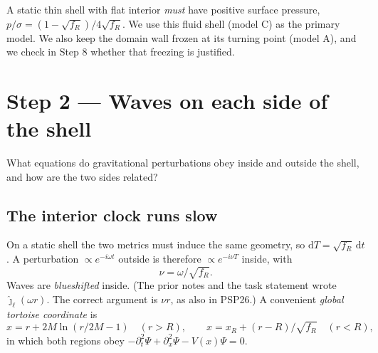 \documentclass[11pt,a4paper]{article}
\numberwithin{equation}{section}
\newcommand{\sq}{\sqrt{f_R}}
\newcommand{\dd}{\mathrm{d}}
\newcommand{\jh}{\hat\jmath_\ell}
\begin{document}
\begin{table}[h]\centering\small
\caption{Background quantities of models C and A. $\omega_{\rm dyn}=\sq(|\ddot R|/R)^{1/2}$ is the wall's collapse rate in
exterior time; $(M/R^3)^{1/2}$ sets the scale of the fluid shell's matter modes.}\label{tab:bg}
\resizebox{\textwidth}{!}{}
\end{table}

\begin{learned}
A static thin shell with flat interior \emph{must} have positive surface pressure, $p/\sigma=(1-\sq)/4\sq$. We use this
fluid shell (model C) as the primary model. We also keep the domain wall frozen at its turning point (model A), and we
check in Step 8 whether that freezing is justified.
\end{learned}

\section{Step 2 --- Waves on each side of the shell}\label{sec:pert}
\begin{question}
What equations do gravitational perturbations obey inside and outside the shell, and how are the two sides related?
\end{question}

\subsection{The interior clock runs slow}
On a static shell the two metrics must induce the same geometry, so $\dd T=\sq\,\dd t$. A perturbation
$\propto e^{-i\omega t}$ outside is therefore $\propto e^{-i\nu T}$ inside, with
\begin{equation}
\nu=\omega/\sq .
\label{eq:nu}
\end{equation}
Waves are \emph{blueshifted} inside. (The prior notes and the task statement wrote $\jh(\omega r)$. The correct
argument is $\nu r$, as also in PSP26.) A convenient \emph{global tortoise coordinate} is
\begin{equation}
x=r+2M\ln(r/2M-1)\quad (r>R),\qquad x=x_R+(r-R)/\sq\quad (r<R),
\label{eq:x}
\end{equation}
in which both regions obey $-\partial_t^2\Psi+\partial_x^2\Psi-V(x)\Psi=0$.
\end{document}
